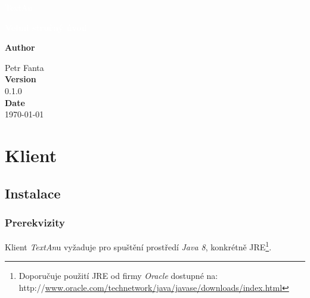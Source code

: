 \documentclass[12pt,a4paper]{report}
\newcommand{\textan}{\emph{TextAn}}
\begin{document}
\begin{titlepage}
\BgThispage

\vspace*{0.3\textheight}
\noindent
\textcolor{white}{\bigsf TextAn}

\vspace*{1cm}
\noindent
\textcolor{white}{\Huge\textbf{\textsf{Velmi stručný úvod}}}

\vspace*{2cm}\par
\noindent
\begin{minipage}{0.35\linewidth}
\textbf{Author}

Petr Fanta\vspace{40pt} \\
\textbf{Version} \\
0.1.0\vspace{40pt} \\
\textbf{Date} \\
\today \\
\end{minipage}


\end{titlepage}
\restoregeometry

\tableofcontents



\chapter{Klient}

\section{Instalace}

\subsection{Prerekvizity}
Klient \textan u vyžaduje pro spuštění prostředí \emph{Java 8}, konkrétně JRE\footnote{Doporučuje použití JRE od firmy \emph{Oracle} dostupné na: http://\url{www.oracle.com/technetwork/java/javase/downloads/index.html}}.
\end{document}
